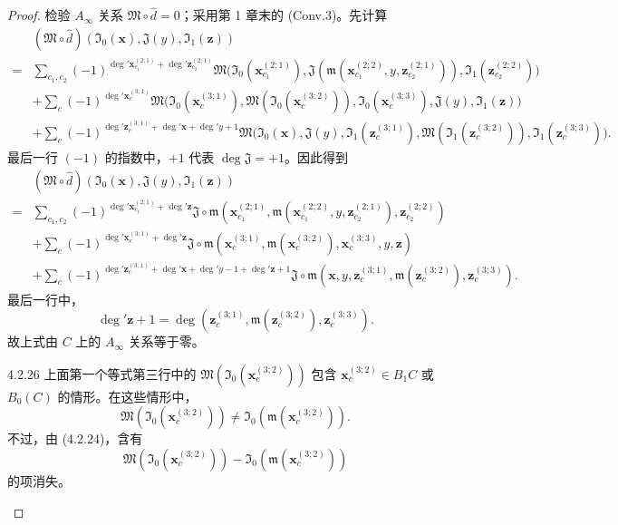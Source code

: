 \begin{proof}
检验 $A_\infty$ 关系 $\mathfrak M\circ\widehat d=0$；采用第 1 章末的
(Conv.3)。先计算
{\scriptsize
\[
\begin{aligned}
&(\mathfrak M\circ\widehat d)
 (\mathfrak I_0(\mathbf x),\mathfrak J(y),\mathfrak I_1(\mathbf z))\\
={}&\sum_{c_1,c_2}(-1)^{
 \deg'\mathbf x_{c_1}^{(2;1)}+\deg'\mathbf z_{c_2}^{(2;1)}}
 \mathfrak M\bigl(\mathfrak I_0(\mathbf x_{c_1}^{(2;1)}),
  \mathfrak J(\mathfrak m(\mathbf x_{c_1}^{(2;2)},y,
    \mathbf z_{c_2}^{(2;1)})),
  \mathfrak I_1(\mathbf z_{c_2}^{(2;2)})\bigr)\\
&+\sum_c(-1)^{\deg'\mathbf x_c^{(3;1)}}
 \mathfrak M\bigl(\mathfrak I_0(\mathbf x_c^{(3;1)}),
  \mathfrak M(\mathfrak I_0(\mathbf x_c^{(3;2)})),
  \mathfrak I_0(\mathbf x_c^{(3;3)}),\mathfrak J(y),
  \mathfrak I_1(\mathbf z)\bigr)\\
&+\sum_c(-1)^{\deg'\mathbf z_c^{(3;1)}+
 \deg'\mathbf x+\deg'y+1}
 \mathfrak M\bigl(\mathfrak I_0(\mathbf x),\mathfrak J(y),
  \mathfrak I_1(\mathbf z_c^{(3;1)}),
  \mathfrak M(\mathfrak I_1(\mathbf z_c^{(3;2)})),
  \mathfrak I_1(\mathbf z_c^{(3;3)})\bigr).
\end{aligned}
\]
}
最后一行 $(-1)$ 的指数中，$+1$ 代表 $\deg\mathfrak J=+1$。因此得到
{\scriptsize
\[
\begin{aligned}
&(\mathfrak M\circ\widehat d)
 (\mathfrak I_0(\mathbf x),\mathfrak J(y),\mathfrak I_1(\mathbf z))\\
={}&\sum_{c_1,c_2}(-1)^{
 \deg'\mathbf x_{c_1}^{(2;1)}+\deg'\mathbf z}
 \mathfrak J\circ\mathfrak m
 (\mathbf x_{c_1}^{(2;1)},
  \mathfrak m(\mathbf x_{c_1}^{(2;2)},y,\mathbf z_{c_2}^{(2;1)}),
  \mathbf z_{c_2}^{(2;2)})\\
&+\sum_c(-1)^{\deg'\mathbf x_c^{(3;1)}+\deg'\mathbf z}
 \mathfrak J\circ\mathfrak m
 (\mathbf x_c^{(3;1)},\mathfrak m(\mathbf x_c^{(3;2)}),
  \mathbf x_c^{(3;3)},y,\mathbf z)\\
&+\sum_c(-1)^{\deg'\mathbf z_c^{(3;1)}+
 \deg'\mathbf x+\deg'y-1+\deg'\mathbf z+1}
 \mathfrak J\circ\mathfrak m
 (\mathbf x,y,\mathbf z_c^{(3;1)},
  \mathfrak m(\mathbf z_c^{(3;2)}),\mathbf z_c^{(3;3)}).
\end{aligned}
\]
}
最后一行中，
\[
 \deg'\mathbf z+1
 =\deg(\mathbf z_c^{(3;1)},\mathfrak m(\mathbf z_c^{(3;2)}),
       \mathbf z_c^{(3;3)}).
\]
故上式由 $C$ 上的 $A_\infty$ 关系等于零。

\begin{remark}{4.2.26}\label{rem:4-2-26}
上面第一个等式第三行中的
$\mathfrak M(\mathfrak I_0(\mathbf x_c^{(3;2)}))$ 包含
$\mathbf x_c^{(3;2)}\in B_1C$ 或 $B_0(C)$ 的情形。在这些情形中，
\[
 \mathfrak M(\mathfrak I_0(\mathbf x_c^{(3;2)}))
 \ne\mathfrak I_0(\mathfrak m(\mathbf x_c^{(3;2)})).
\]
不过，由 (4.2.24)，含有
\[
 \mathfrak M(\mathfrak I_0(\mathbf x_c^{(3;2)}))
 -\mathfrak I_0(\mathfrak m(\mathbf x_c^{(3;2)}))
\]
的项消失。
\end{remark}


\end{proof}
